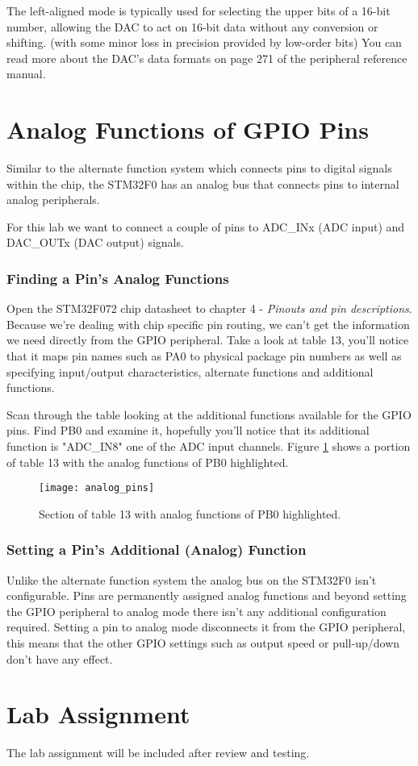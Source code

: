 \documentclass[11pt,fleqn]{book} %
\begin{document}
The left-aligned mode is typically used for selecting the upper bits of a 16-bit number, allowing the DAC to act on 16-bit data without any conversion or shifting. (with some minor loss in precision provided by low-order bits) You can read more about the DAC's data formats on page 271 of the peripheral reference manual.

\section{Analog Functions of GPIO Pins}
Similar to the alternate function system which connects pins to digital signals within the chip, the STM32F0 has an analog bus that connects pins to internal analog peripherals. 

For this lab we want to connect a couple of pins to ADC\_INx (ADC input) and DAC\_OUTx (DAC output) signals. 

\subsubsection{Finding a Pin's Analog Functions}
Open the STM32F072 chip datasheet to chapter 4 - \textit{Pinouts and pin descriptions}. Because we're dealing with chip specific pin routing, we can't get the information we need directly from the GPIO peripheral. Take a look at table 13, you'll notice that it maps pin names such as PA0 to physical package pin numbers as well as specifying input/output characteristics, alternate functions and additional functions.

Scan through the table looking at the additional functions available for the GPIO pins. Find PB0 and examine it, hopefully you'll notice that its additional function is "ADC\_IN8" one of the ADC input channels. Figure \ref{analog_pins} shows a portion of table 13 with the analog functions of PB0 highlighted.

\begin{figure}[]
    \centering\texttt{[image: analog\_pins]}
    \caption{Section of table 13 with analog functions of PB0 highlighted.}
    \label{analog_pins}
\end{figure}

\subsubsection{Setting a Pin's Additional (Analog) Function}
Unlike the alternate function system the analog bus on the STM32F0 isn't configurable. Pins are permanently assigned analog functions and beyond setting the GPIO peripheral to analog mode there isn't any additional configuration required. Setting a pin to analog mode disconnects it from the GPIO peripheral, this means that the other GPIO settings such as output speed or pull-up/down don't have any effect.

\section{Lab Assignment}
The lab assignment will be included after review and testing. 
\end{document}
